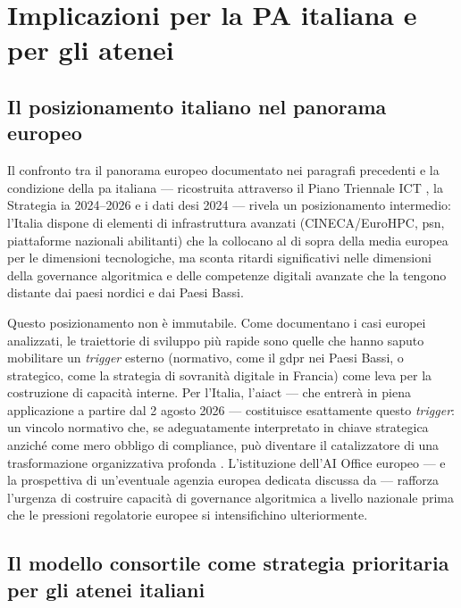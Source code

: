 \section{Implicazioni per la PA italiana e per gli atenei}
\label{sec:implicazioni-italiane}

\subsection{Il posizionamento italiano nel panorama europeo}

Il confronto tra il panorama europeo documentato nei paragrafi precedenti e la
condizione della \gls{pa} italiana --- ricostruita attraverso il Piano Triennale ICT
\parencite{AgIDPianoTriennale2024}, la Strategia \gls{ia} 2024--2026
\parencite{StrategiaIA2024} e i dati \gls{desi} 2024 \parencite{DESI2024} --- rivela un
posizionamento intermedio: l'Italia dispone di elementi di infrastruttura avanzati
(CINECA/EuroHPC, \gls{psn}, piattaforme nazionali abilitanti) che la collocano al di
sopra della media europea per le dimensioni tecnologiche, ma sconta ritardi
significativi nelle dimensioni della governance algoritmica e delle competenze
digitali avanzate che la tengono distante dai paesi nordici e dai Paesi Bassi.

Questo posizionamento non è immutabile. Come documentano i casi europei analizzati,
le traiettorie di sviluppo più rapide sono quelle che hanno saputo mobilitare
un \textit{trigger} esterno (normativo, come il \gls{gdpr} nei Paesi Bassi, o strategico,
come la strategia di sovranità digitale in Francia) come leva per la costruzione
di capacità interne. Per l'Italia, l'\gls{aiact} --- che entrerà in piena
applicazione a partire dal 2 agosto 2026 --- costituisce esattamente questo
\textit{trigger}: un vincolo normativo che, se adeguatamente interpretato in
chiave strategica anziché come mero obbligo di compliance, può diventare il
catalizzatore di una trasformazione organizzativa profonda
\parencite{Pavlidis2025EUAIAgency}. L'istituzione dell'AI Office europeo ---
e la prospettiva di un'eventuale agenzia europea dedicata discussa da
\textcite{Pavlidis2025EUAIAgency} --- rafforza l'urgenza di costruire
capacità di governance algoritmica a livello nazionale prima che le pressioni
regolatorie europee si intensifichino ulteriormente.

\subsection{Il modello consortile come strategia prioritaria per gli atenei italiani}

